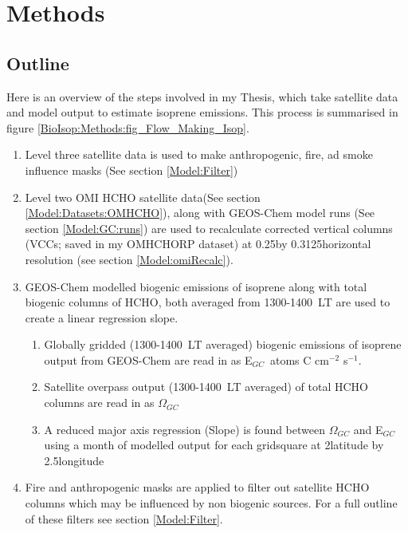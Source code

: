   
  
\section{Methods}
  \label{BioIsop:Methods}
  
  \subsection{Outline}
    Here is an overview of the steps involved in my Thesis, which take satellite data and model output to estimate isoprene emissions.
    This process is summarised in figure \ref{BioIsop:Methods:fig_Flow_Making_Isop}.
    \begin{enumerate}
      \item 
        Level three satellite data is used to make anthropogenic, fire, ad smoke influence masks (See section \ref{Model:Filter})
      \item 
        Level two OMI HCHO satellite data(See section \ref{Model:Datasets:OMHCHO}), along with GEOS-Chem model runs (See section \ref{Model:GC:runs}) are used to recalculate corrected vertical columns (VCCs; saved in my OMHCHORP dataset) at 0.25\degr by 0.3125\degr horizontal resolution (see section \ref{Model:omiRecalc}).
      \item 
        GEOS-Chem modelled biogenic emissions of isoprene along with total biogenic columns of HCHO, both averaged from 1300-1400~LT are used to create a linear regression slope.
      \begin{enumerate}
        \item Globally gridded (1300-1400~LT averaged) biogenic emissions of isoprene output from GEOS-Chem are read in as E$_{GC}$~atoms C cm$^{-2}$ s$^{-1}$.
        \item Satellite overpass output (1300-1400~LT averaged) of total HCHO columns are read in as $\Omega_{GC}$\moleccm
        \item A reduced major axis regression (Slope) is found between $\Omega_{GC}$ and E$_{GC}$ using a month of modelled output for each gridsquare at 2\degr latitude by 2.5\degr longitude
      \end{enumerate}
      \item 
        Fire and anthropogenic masks are applied to filter out satellite HCHO columns which may be influenced by non biogenic sources.
        For a full outline of these filters see section \ref{Model:Filter}.

\end{enumerate}
